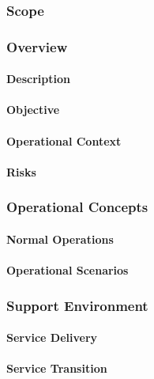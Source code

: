 ﻿%

\subsubsection{Scope}

\subsubsection{Overview}

\paragraph{Description}

\paragraph{Objective}

\paragraph{Operational Context}

\paragraph{Risks}

\subsubsection{Operational Concepts}

\paragraph{Normal Operations}

\paragraph{Operational Scenarios}

\subsubsection{Support Environment}

\paragraph{Service Delivery}

\paragraph{Service Transition}
